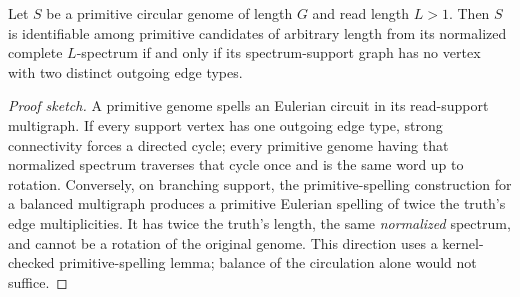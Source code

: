 \begin{theorem}
\label{thm:identifiable-iff-nonbranching}
Let $S$ be a primitive circular genome of length $G$ and read length $L>1$.
Then $S$ is identifiable among primitive candidates of arbitrary length from
its normalized complete $L$-spectrum if and only if its spectrum-support
graph has no vertex with two distinct outgoing edge types.
\end{theorem}
\begin{proof}[Proof sketch]
A primitive genome spells an Eulerian circuit in its read-support
multigraph. If every support vertex has one outgoing edge type,
strong connectivity forces a directed cycle; every primitive
genome having that normalized spectrum traverses that cycle once
and is the same word up to rotation. Conversely, on branching
support, the primitive-spelling construction for a balanced
multigraph produces a primitive Eulerian spelling of twice
the truth's edge multiplicities. It has twice the truth's length,
the same \emph{normalized} spectrum, and cannot be a rotation
of the original genome. This direction uses a kernel-checked
primitive-spelling lemma; balance of the circulation
alone would not suffice.
\end{proof}

